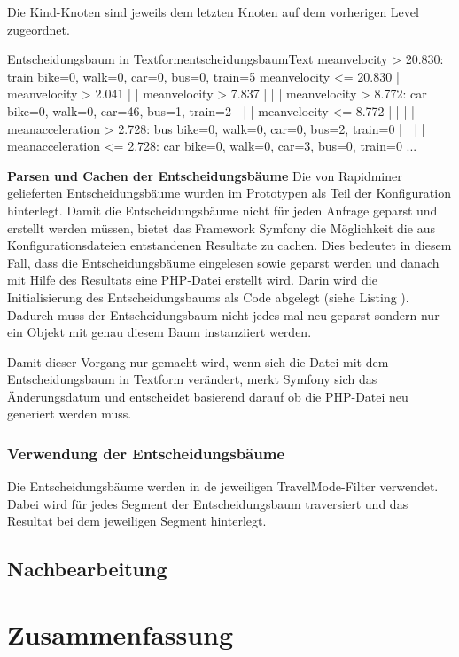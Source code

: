 Die Kind-Knoten sind jeweils dem letzten Knoten auf dem vorherigen Level zugeordnet.

\begin{code}[]{Entscheidungsbaum in Textform}{entscheidungsbaumText}
meanvelocity > 20.830: train {bike=0, walk=0, car=0, bus=0, train=5}
meanvelocity <= 20.830
|   meanvelocity > 2.041
|   |   meanvelocity > 7.837
|   |   |   meanvelocity > 8.772: car {bike=0, walk=0, car=46, bus=1, train=2}
|   |   |   meanvelocity <= 8.772
|   |   |   |   meanacceleration > 2.728: bus {bike=0, walk=0, car=0, bus=2, train=0}
|   |   |   |   meanacceleration <= 2.728: car {bike=0, walk=0, car=3, bus=0, train=0}
...
\end{code}

\textbf{Parsen und Cachen der Entscheidungsbäume}
Die von Rapidminer gelieferten Entscheidungsbäume wurden im Prototypen als Teil der Konfiguration hinterlegt. Damit die Entscheidungsbäume nicht für jeden Anfrage geparst und erstellt werden müssen, bietet das Framework Symfony die Möglichkeit die aus Konfigurationsdateien entstandenen Resultate zu cachen. Dies bedeutet in diesem Fall, dass die Entscheidungsbäume eingelesen sowie geparst werden und danach mit Hilfe des Resultats eine PHP-Datei erstellt wird. Darin wird die Initialisierung des Entscheidungsbaums als Code abgelegt (siehe Listing ). Dadurch muss der Entscheidungsbaum nicht jedes mal neu geparst sondern nur ein Objekt mit genau diesem Baum instanziiert werden. 

\begin{code}[PHP]{Ausschnitt des generierten Entscheidungsbaums als PHP-Klasse}{entscheidungsbaumPHP}
...
class BasicDecisionTree implements DecisionTreeInterface
{
    protected $tree;

    function __construct()
    {
        $node0 = new Node();
        $node0->setDecision(new Decision('meanvelocity', '>', 20.83));
        $node1 = new Node();
        $node1->setResult(new Result(0,0,0,0,5));
        ...
        $node0->setRight($node2);
        $node1->setParent($node1);
        $node2->setParent($node0);
        $node2->setLeft($node3);
        ...
\end{code}

Damit dieser Vorgang nur gemacht wird, wenn sich die Datei mit dem Entscheidungsbaum in Textform verändert, merkt Symfony sich das Änderungsdatum und entscheidet basierend darauf ob die PHP-Datei neu generiert werden muss.

\subsubsection{Verwendung der Entscheidungsbäume}
\label{entscheidungsbaum_verwendung}
Die Entscheidungsbäume werden in de jeweiligen TravelMode-Filter verwendet. Dabei wird für jedes Segment der Entscheidungsbaum traversiert und das Resultat bei dem jeweiligen Segment hinterlegt. 

\subsection{Nachbearbeitung}

\clearpage
\section{Zusammenfassung}
